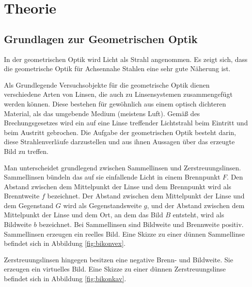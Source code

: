 \section{Theorie}
\label{sec:Theorie}

\subsection{Grundlagen zur Geometrischen Optik}
\label{subsec:Grundlagen}
In der geometrischen Optik wird Licht als Strahl angenommen. Es zeigt sich, dass
die geometrische Optik für Achsennahe Stahlen eine sehr gute Näherung ist.

Als Grundlegende Versuchsobjekte für die geometrische Optik dienen verschiedene Arten von Linsen, die
auch zu Linsensystemen zusammengefügt werden können. Diese bestehen für gewöhnlich aus einem optisch
dichteren Material, als das umgebende Medium (meistens Luft). Gemäß des Brechungsgesetzes wird
ein auf eine Linse treffender Lichtstrahl beim Eintritt und beim Austritt gebrochen. Die Aufgabe
der geometrischen Optik besteht darin, diese Strahlenverläufe darzustellen und aus ihnen
Aussagen über das erzeugte Bild zu treffen.

Man unterscheidet grundlegend zwischen Sammellinsen und Zerstreuungslinsen. Sammellinsen bündeln
das auf sie einfallende Licht in einem Brennpunkt $F$. Den Abstand zwischen dem Mittelpunkt
der Linse und dem Brennpunkt wird als Brenntweite $f$ bezeichnet. Der Abstand zwischen dem
Mittelpunkt der Linse und dem Gegenstand $G$ wird als Gegenstandsweite $g$, und der Abstand
zwischen dem Mittelpunkt der Linse und dem Ort, an dem das Bild $B$ entsteht, wird als
Bildweite $b$ bezeichnet. Bei Sammellinsen sind Bildweite und Brennweite positiv.
Sammellinsen erzeugen ein reelles Bild. Eine Skizze zu einer dünnen Sammellinse befindet sich in Abbildung
\ref{fig:bikonvex}.

Zerstreuungslinsen hingegen besitzen eine negative Brenn- und Bildweite. Sie erzeugen ein
virtuelles Bild. Eine Skizze zu einer dünnen Zerstreuungslinse befindet sich in Abbildung
\ref{fig:bikonkav}.

